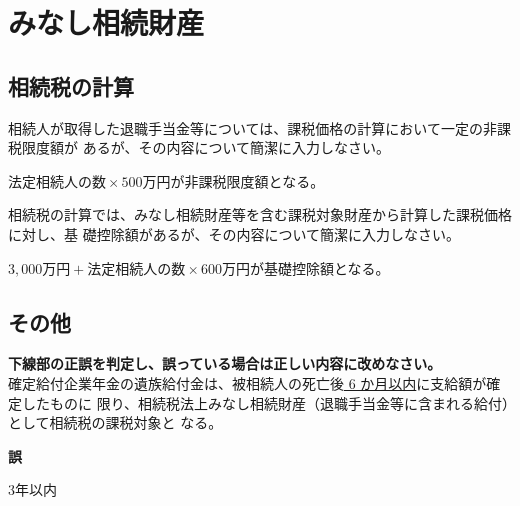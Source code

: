 \section{みなし相続財産}

\subsection{相続税の計算}

\begin{shortanswer}[年金1 2022 問題2(5)ア]
  相続人が取得した退職手当金等については、課税価格の計算において一定の非課税限度額が
あるが、その内容について簡潔に入力しなさい。
\end{shortanswer}

\begin{answerbox}
  $法定相続人の数 \times 500万円$が非課税限度額となる。
\end{answerbox}


\begin{shortanswer}[年金1 2022 問題2(5)イ]
  相続税の計算では、みなし相続財産等を含む課税対象財産から計算した課税価格に対し、基
礎控除額があるが、その内容について簡潔に入力しなさい。
\end{shortanswer}

\begin{answerbox}
  $3,000万円 + 法定相続人の数 \times 600万円$が基礎控除額となる。
\end{answerbox}

\newpage 

\subsection{その他}

\begin{truefalse}[年金1 H29 問題1(6)\textcircled{5}]
           \textbf{下線部の正誤を判定し、誤っている場合は正しい内容に改めなさい。}
\\  

  確定給付企業年金の遺族給付金は、被相続人の死亡後\underline{ 6 か月以内}に支給額が確定したものに
限り、相続税法上みなし相続財産（退職手当金等に含まれる給付）として相続税の課税対象と
なる。
\end{truefalse}

\begin{answerbox}
  \textbf{誤}

  3年以内
\end{answerbox}

\newpage